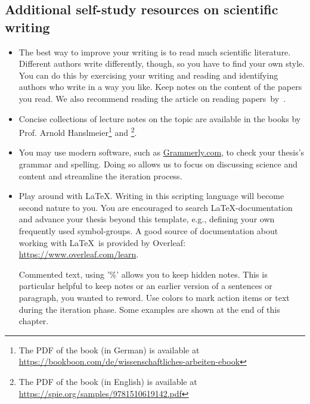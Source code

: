 \subsection*{Additional self-study resources on scientific writing}
\begin{itemize}
    
\item The best way to improve your writing is to read much scientific literature. Different authors write differently, though, so you have to find your own style. You can do this by exercising your writing and reading and identifying authors who write in a way you like. Keep notes on the content of the papers you read. We also recommend reading the article on reading \hbox{papers by \cite{PaperOnRreadingPapers}.}
    
    \item Concise collections of lecture notes on the topic are available in the books by Prof. Arnold Hanslmeier\footnote{The PDF of the book (in German) is available at  \hbox{\href{https://bookboon.com/de/wissenschaftliches-arbeiten-ebook}{https://bookboon.com/de/wissenschaftliches-arbeiten-ebook}}} and \cite{Mack2018Book}\footnote{The PDF of the book (in English) is available at \href{https://spie.org/samples/9781510619142.pdf}{https://spie.org/samples/9781510619142.pdf}}.
    
    \item You may use modern software, such as \href{http://www.Grammerly.com}{Grammerly.com}, to check your thesis's grammar and spelling. Doing so allows us to focus on discussing science and content and streamline the iteration process.
    
    \item Play around with \LaTeX. Writing in this scripting language will become second nature to you. You are encouraged to search \LaTeX-documentation and advance your thesis beyond this template, e.g., defining your own frequently used symbol-groups. A good source of documentation about working with \LaTeX\ is provided by Overleaf: \href{https://www.overleaf.com/learn}{https://www.overleaf.com/learn}.
    
    Commented text, using '\%' allows you to keep hidden notes. This is particular helpful to keep  notes or an earlier version of a sentences or paragraph, you wanted to reword.  
    Use colors to mark action items or text during the iteration phase. Some examples are shown at the end of this chapter.
\end{itemize}


